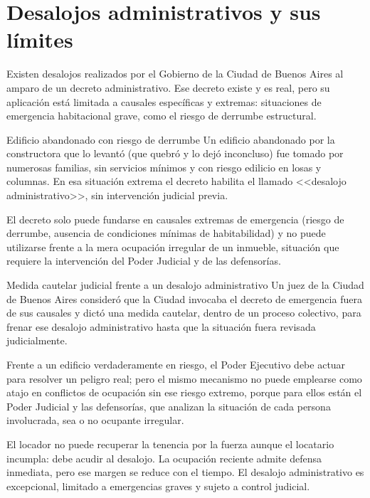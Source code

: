 \documentclass[12pt,oneside]{book}
\begin{document}
\section{Desalojos administrativos y sus límites}

Existen desalojos realizados por el Gobierno de la Ciudad de Buenos Aires al amparo de un decreto administrativo. Ese decreto existe y es real, pero su aplicación está limitada a causales específicas y extremas: situaciones de emergencia habitacional grave, como el riesgo de derrumbe estructural.

\begin{example}{Edificio abandonado con riesgo de derrumbe}
Un edificio abandonado por la constructora que lo levantó (que quebró y lo dejó inconcluso) fue tomado por numerosas familias, sin servicios mínimos y con riesgo edilicio en losas y columnas. En esa situación extrema el decreto habilita el llamado <<desalojo administrativo>>, sin intervención judicial previa.
\end{example}

\begin{important}
El decreto solo puede fundarse en causales extremas de emergencia (riesgo de derrumbe, ausencia de condiciones mínimas de habitabilidad) y no puede utilizarse frente a la mera ocupación irregular de un inmueble, situación que requiere la intervención del Poder Judicial y de las defensorías.
\end{important}

\begin{example}{Medida cautelar judicial frente a un desalojo administrativo}
Un juez de la Ciudad de Buenos Aires consideró que la Ciudad invocaba el decreto de emergencia fuera de sus causales y dictó una medida cautelar, dentro de un proceso colectivo, para frenar ese desalojo administrativo hasta que la situación fuera revisada judicialmente.
\end{example}

Frente a un edificio verdaderamente en riesgo, el Poder Ejecutivo debe actuar para resolver un peligro real; pero el mismo mecanismo no puede emplearse como atajo en conflictos de ocupación sin ese riesgo extremo, porque para ellos están el Poder Judicial y las defensorías, que analizan la situación de cada persona involucrada, sea o no ocupante irregular.

\begin{sintesis}
El locador no puede recuperar la tenencia por la fuerza aunque el locatario incumpla: debe acudir al desalojo. La ocupación reciente admite defensa inmediata, pero ese margen se reduce con el tiempo. El desalojo administrativo es excepcional, limitado a emergencias graves y sujeto a control judicial.
\end{sintesis}
\end{document}
